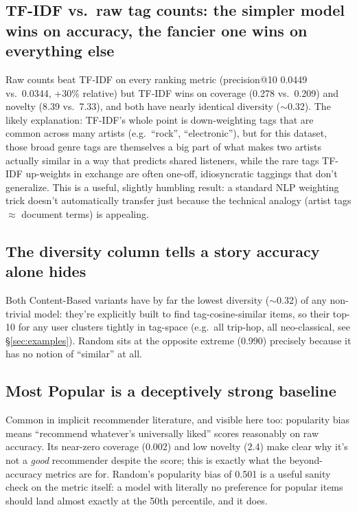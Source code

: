 \documentclass[11pt,a4paper]{article}
\newcommand{\secref}[1]{\S\ref{#1}}
\begin{document}
\subsection{TF-IDF vs.\ raw tag counts: the simpler model wins on accuracy, the fancier one wins on everything else}

Raw counts beat TF-IDF on every ranking metric (precision@10 0.0449 vs.\ 0.0344, +30\% relative) but TF-IDF wins on coverage (0.278 vs.\ 0.209) and novelty (8.39 vs.\ 7.33), and both have nearly identical diversity ($\sim$0.32). The likely explanation: TF-IDF's whole point is down-weighting tags that are common across many artists (e.g.\ ``rock'', ``electronic''), but for this dataset, those broad genre tags are themselves a big part of what makes two artists actually similar in a way that predicts shared listeners, while the rare tags TF-IDF up-weights in exchange are often one-off, idiosyncratic taggings that don't generalize. This is a useful, slightly humbling result: a standard NLP weighting trick doesn't automatically transfer just because the technical analogy (artist tags $\approx$ document terms) is appealing.

\subsection{The diversity column tells a story accuracy alone hides}

Both Content-Based variants have by far the lowest diversity ($\sim$0.32) of any non-trivial model: they're explicitly built to find tag-cosine-similar items, so their top-10 for any user clusters tightly in tag-space (e.g.\ all trip-hop, all neo-classical, see \secref{sec:examples}). Random sits at the opposite extreme (0.990) precisely because it has no notion of ``similar'' at all.

\subsection{Most Popular is a deceptively strong baseline}

Common in implicit recommender literature, and visible here too: popularity bias means ``recommend whatever's universally liked'' scores reasonably on raw accuracy. Its near-zero coverage (0.002) and low novelty (2.4) make clear why it's not a \emph{good} recommender despite the score; this is exactly what the beyond-accuracy metrics are for. Random's popularity bias of 0.501 is a useful sanity check on the metric itself: a model with literally no preference for popular items should land almost exactly at the 50th percentile, and it does.
\end{document}
